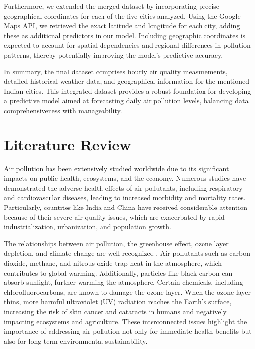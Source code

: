 \documentclass[twoside,11pt]{article}
\begin{document}
Furthermore, we extended the merged dataset by incorporating precise geographical coordinates for each of the five cities analyzed. Using the Google Maps API, we retrieved the exact latitude and longitude for each city, adding these as additional predictors in our model. Including geographic coordinates is expected to account for spatial dependencies and regional differences in pollution patterns, thereby potentially improving the model's predictive accuracy.

In summary, the final dataset comprises hourly air quality measurements, detailed historical weather data, and geographical information for the mentioned Indian cities. This integrated dataset provides a robust foundation for developing a predictive model aimed at forecasting daily air pollution levels, balancing data comprehensiveness with manageability.

\newpage





\section{Literature Review}
Air pollution has been extensively studied worldwide due to its significant impacts on public health, ecosystems, and the economy. Numerous studies have demonstrated the adverse health effects of air pollutants, including respiratory and cardiovascular diseases, leading to increased morbidity and mortality rates. Particularly, countries like India and China have received considerable attention because of their severe air quality issues, which are exacerbated by rapid industrialization, urbanization, and population growth.

The relationships between air pollution, the greenhouse effect, ozone layer depletion, and climate change are well recognized \citep{manisalidis2020environmental}. Air pollutants such as carbon dioxide, methane, and nitrous oxide trap heat in the atmosphere, which contributes to global warming. Additionally, particles like black carbon can absorb sunlight, further warming the atmosphere. Certain chemicals, including chlorofluorocarbons, are known to damage the ozone layer. When the ozone layer thins, more harmful ultraviolet (UV) radiation reaches the Earth's surface, increasing the risk of skin cancer and cataracts in humans and negatively impacting ecosystems and agriculture. These interconnected issues highlight the importance of addressing air pollution not only for immediate health benefits but also for long-term environmental sustainability.
\end{document}
